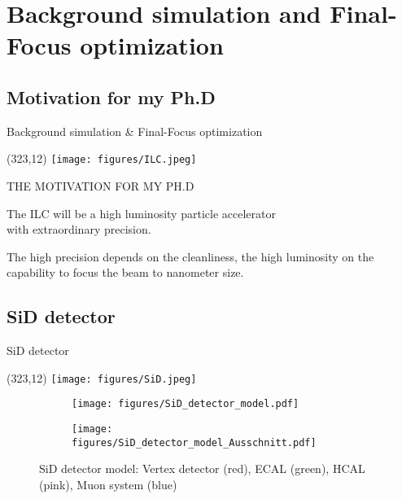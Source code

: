 \documentclass[xcolor={dvipsnames}]{beamer}
\newcommand{\sidlogo}{
  \setlength{\TPHorizModule}{1pt}
  \setlength{\TPVertModule}{1pt}
  \begin{textblock}{1}(323,12)
   \texttt{[image: figures/SiD.jpeg]}
  \end{textblock}
  }
\newcommand{\ilclogo}{
  \setlength{\TPHorizModule}{1pt}
  \setlength{\TPVertModule}{1pt}
  \begin{textblock}{1}(323,12)
   \texttt{[image: figures/ILC.jpeg]}
  \end{textblock}
}
\begin{document}
\section{Background simulation and Final-Focus optimization}
\subsection{Motivation for my Ph.D}
\begin{frame}{Background simulation \& Final-Focus optimization}
\ilclogo
\begin{center}
 \alert{\MakeUppercase{The motivation for my Ph.D}}
\end{center}
\begin{block}{}
\centering The ILC will be a \textcolor{Periwinkle}{high luminosity} particle accelerator \\with \textcolor{JungleGreen}{extraordinary precision}.
\end{block}
\vspace*{1cm}
\textcolor{JungleGreen}{The high precision depends on the cleanliness}, \textcolor{Periwinkle}{the high luminosity on the capability to focus the beam to nanometer size}.\\
\vspace*{0.5cm}
\end{frame}

\subsection{SiD detector}
\begin{frame}{SiD detector}
\sidlogo
\begin{figure}[T]
\centering
\begin{subfigure}[b]{0.49\textwidth}
\centering
\texttt{[image: figures/SiD\_detector\_model.pdf]}
\end{subfigure}
\begin{subfigure}[b]{0.49\textwidth}
\centering
\texttt{[image: figures/SiD\_detector\_model\_Ausschnitt.pdf]}
\end{subfigure}
\caption{\small SiD detector model: Vertex detector (red), ECAL (green), HCAL (pink), Muon system (blue)}
\end{figure}
\end{frame}
\end{document}
